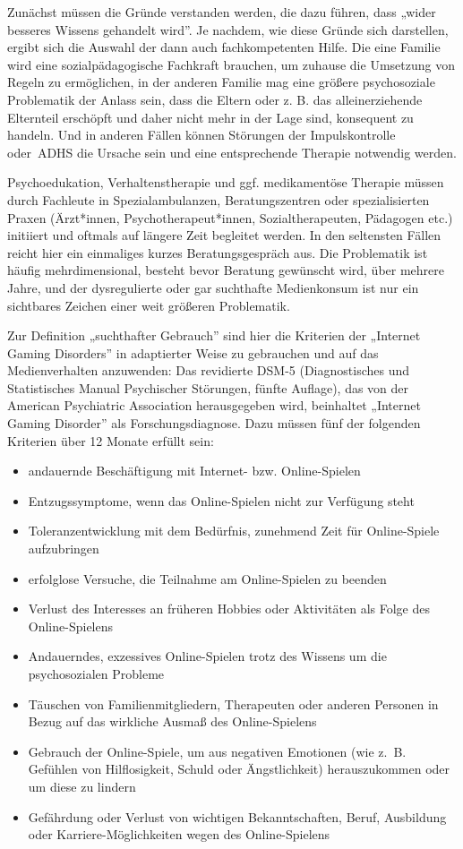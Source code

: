 \documentclass[
  letterpaper,
  DIV=11]{scrartcl}
\begin{document}
Zunächst müssen die Gründe verstanden werden, die dazu führen, dass
„wider besseres Wissens gehandelt wird''. Je nachdem, wie diese Gründe
sich darstellen, ergibt sich die Auswahl der dann auch fachkompetenten
Hilfe. Die eine Familie wird eine sozialpädagogische Fachkraft brauchen,
um zuhause die Umsetzung von Regeln zu ermöglichen, in der anderen
Familie mag eine größere psychosoziale Problematik der Anlass sein, dass
die Eltern oder z. B. das alleinerziehende Elternteil erschöpft und
daher nicht mehr in der Lage sind, konsequent zu handeln. Und in anderen
Fällen können Störungen der Impulskontrolle oder~ADHS die Ursache sein
und eine entsprechende Therapie notwendig werden.

Psychoedukation, Verhaltenstherapie und ggf. medikamentöse Therapie
müssen durch Fachleute in Spezialambulanzen, Beratungszentren oder
spezialisierten Praxen (Ärzt*innen, Psychotherapeut*innen,
Sozialtherapeuten, Pädagogen etc.) initiiert und oftmals auf längere
Zeit begleitet werden. In den seltensten Fällen reicht hier ein
einmaliges kurzes Beratungsgespräch aus. Die Problematik ist häufig
mehrdimensional, besteht bevor Beratung gewünscht wird, über mehrere
Jahre, und der dysregulierte oder gar suchthafte Medienkonsum ist nur
ein sichtbares Zeichen einer weit größeren Problematik.

Zur Definition „suchthafter Gebrauch'' sind hier die Kriterien der
„Internet Gaming Disorders'' in adaptierter Weise zu gebrauchen und auf
das Medienverhalten anzuwenden: Das revidierte DSM-5 (Diagnostisches und
Statistisches Manual Psychischer Störungen, fünfte Auflage), das von der
American Psychiatric Association herausgegeben wird, beinhaltet
„Internet Gaming Disorder'' als Forschungsdiagnose. Dazu müssen fünf der
folgenden Kriterien über 12 Monate erfüllt sein:

\begin{itemize}
\item
  andauernde Beschäftigung mit Internet- bzw. Online-Spielen
\item
  Entzugssymptome, wenn das Online-Spielen nicht zur Verfügung steht
\item
  Toleranzentwicklung mit dem Bedürfnis, zunehmend Zeit für
  Online-Spiele aufzubringen
\item
  erfolglose Versuche, die Teilnahme am Online-Spielen zu beenden
\item
  Verlust des Interesses an früheren Hobbies oder Aktivitäten als Folge
  des Online-Spielens
\item
  Andauerndes, exzessives Online-Spielen trotz des Wissens um die
  psychosozialen Probleme
\item
  Täuschen von Familienmitgliedern, Therapeuten oder anderen Personen in
  Bezug auf das wirkliche Ausmaß des Online-Spielens
\item
  Gebrauch der Online-Spiele, um aus negativen Emotionen (wie z.~B.
  Gefühlen von Hilflosigkeit, Schuld oder Ängstlichkeit) herauszukommen
  oder um diese zu lindern
\item
  Gefährdung oder Verlust von wichtigen Bekanntschaften, Beruf,
  Ausbildung oder Karriere-Möglichkeiten wegen des Online-Spielens
\end{itemize}
\end{document}
